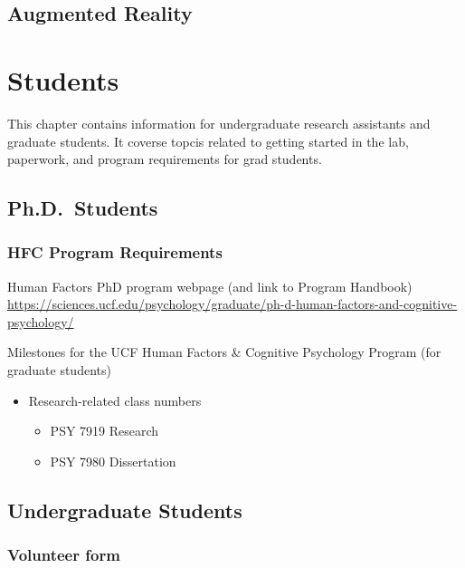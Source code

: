 \documentclass[
]{book}
\providecommand{\tightlist}{%
  \setlength{\itemsep}{0pt}\setlength{\parskip}{0pt}}
\begin{document}
\hypertarget{augmented-reality}{%
\section{Augmented Reality}\label{augmented-reality}}

\hypertarget{students}{%
\chapter{Students}\label{students}}

This chapter contains information for undergraduate research assistants and graduate students. It coverse topcis related to getting started in the lab, paperwork, and program
requirements for grad students.

\hypertarget{ph.d.-students}{%
\section{Ph.D.~Students}\label{ph.d.-students}}

\hypertarget{hfc-program-requirements}{%
\subsection{HFC Program Requirements}\label{hfc-program-requirements}}

Human Factors PhD program webpage (and link to Program Handbook)
\url{https://sciences.ucf.edu/psychology/graduate/ph-d-human-factors-and-cognitive-psychology/}

Milestones for the UCF Human Factors \& Cognitive Psychology Program (for graduate students)

\begin{itemize}
\tightlist
\item
  Research-related class numbers

  \begin{itemize}
  \tightlist
  \item
    PSY 7919 Research
  \item
    PSY 7980 Dissertation
  \end{itemize}
\end{itemize}

\hypertarget{undergraduate-students}{%
\section{Undergraduate Students}\label{undergraduate-students}}

\hypertarget{volunteer-form}{%
\subsection{Volunteer form}\label{volunteer-form}}
\end{document}

